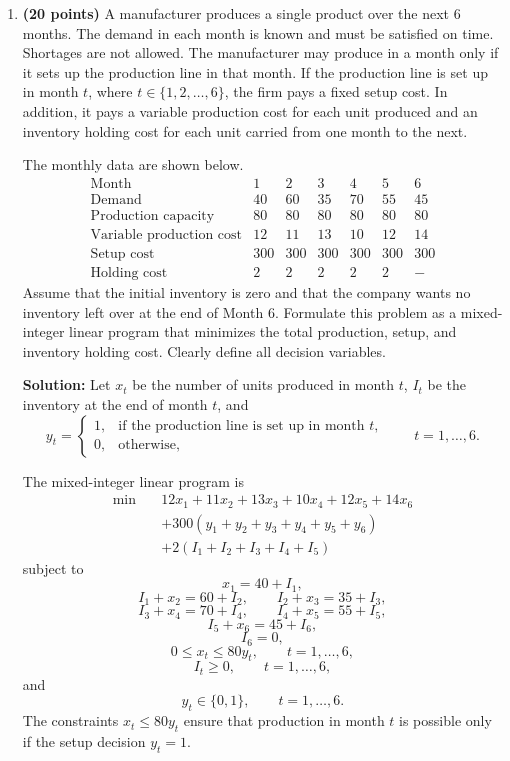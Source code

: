 \documentclass[11pt]{article}
\begin{document}
\begin{enumerate}
\item \textbf{(20 points)} A manufacturer produces a single product over the next 6 months. The demand in each month is known and must be satisfied on time. Shortages are not allowed. The manufacturer may produce in a month only if it sets up the production line in that month. If the production line is set up in month $t$, where $t\in\{1,2,\ldots,6\}$, the firm pays a fixed setup cost. In addition, it pays a variable production cost for each unit produced and an inventory holding cost for each unit carried from one month to the next.

The monthly data are shown below.
\[
\begin{array}{c|cccccc}
\text{Month} & 1 & 2 & 3 & 4 & 5 & 6\\
\hline
\text{Demand} & 40 & 60 & 35 & 70 & 55 & 45\\
\text{Production capacity} & 80 & 80 & 80 & 80 & 80 & 80\\
\text{Variable production cost} & 12 & 11 & 13 & 10 & 12 & 14\\
\text{Setup cost} & 300 & 300 & 300 & 300 & 300 & 300\\
\text{Holding cost} & 2 & 2 & 2 & 2 & 2 & -
\end{array}
\]
Assume that the initial inventory is zero and that the company wants no inventory left over at the end of Month 6. Formulate this problem as a mixed-integer linear program that minimizes the total production, setup, and inventory holding cost. Clearly define all decision variables.

{\color{red}
\textbf{Solution:}
Let $x_t$ be the number of units produced in month $t$, $I_t$ be the inventory at the end of month $t$, and
\[
y_t=
\begin{cases}
1, & \text{if the production line is set up in month }t,\\
0, & \text{otherwise,}
\end{cases}
\qquad t=1,\ldots,6.
\]

The mixed-integer linear program is
\[
\begin{aligned}
\min \quad
&12x_1+11x_2+13x_3+10x_4+12x_5+14x_6\\
&+300(y_1+y_2+y_3+y_4+y_5+y_6)\\
&+2(I_1+I_2+I_3+I_4+I_5)
\end{aligned}
\]
subject to
\[
x_1=40+I_1,
\]
\[
I_1+x_2=60+I_2,\qquad
I_2+x_3=35+I_3,
\]
\[
I_3+x_4=70+I_4,\qquad
I_4+x_5=55+I_5,
\]
\[
I_5+x_6=45+I_6,
\]
\[
I_6=0,
\]
\[
0\leq x_t\leq 80y_t,\qquad t=1,\ldots,6,
\]
\[
I_t\geq 0,\qquad t=1,\ldots,6,
\]
and
\[
y_t\in\{0,1\},\qquad t=1,\ldots,6.
\]
The constraints $x_t\leq 80y_t$ ensure that production in month $t$ is possible only if the setup decision $y_t=1$.
}


\end{enumerate}
\end{document}
